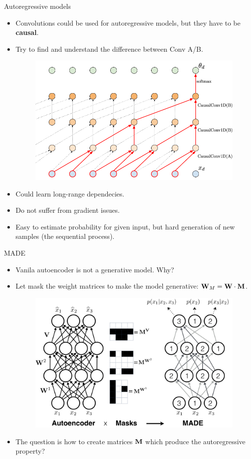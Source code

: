 \begin{frame}{Autoregressive models}
		\begin{itemize}
			\item Convolutions could be used for autoregressive models, but they have to be \textbf{causal}. \\
			\item Try to find and understand the difference between Conv A/B.
		    \begin{figure}
		        \centering
		        \includegraphics[width=0.7\linewidth]{figs/sequential_CNN}
		    \end{figure}
		    \item Could learn long-range dependecies.
		    \item Do not suffer from gradient issues.
		    \item Easy to estimate probability for given input, but hard generation of new samples (the sequential process).
	   	\end{itemize}
\end{frame}
\begin{frame}{MADE}
	\begin{itemize}
		\item Vanila autoencoder is not a generative model. Why?
		\item Let mask the weight matrices to make the model generative: $\mathbf{W}_M = \mathbf{W} \cdot \mathbf{M}$.
		\begin{figure}
		    \centering
		    \includegraphics[width=0.7\linewidth]{figs/made}
		\end{figure}
		\item The question is how to create matrices $\mathbf{M}$ which produce the autoregressive property?
	\end{itemize}
\end{frame}
